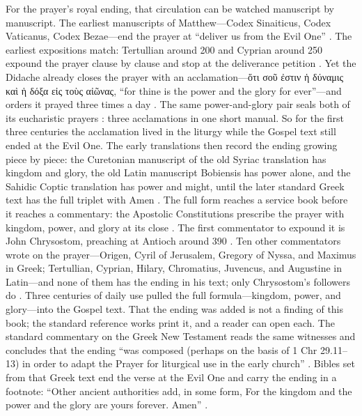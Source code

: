 For the prayer's royal ending, that circulation can be watched manuscript by manuscript.
The earliest manuscripts of Matthew---Codex Sinaiticus, Codex Vaticanus, Codex Bezae---end the prayer at ``deliver us from the Evil One'' \cite[on Matt.~6:13]{westcotthort:appendix}.
The earliest expositions match: Tertullian around 200 and Cyprian around 250 expound the prayer clause by clause and stop at the deliverance petition \cite[2--8]{tertullian:oratione} \cite[9--27]{cyprian:oratione}.
Yet the Didache already closes the prayer with an acclamation---ὅτι σοῦ ἐστιν ἡ δύναμις καὶ ἡ δόξα εἰς τοὺς αἰῶνας, ``for thine is the power and the glory for ever''---and orders it prayed three times a day \cite[8.2--8.3]{didache}.
The same power-and-glory pair seals both of its eucharistic prayers \cite[9.4, 10.5]{didache}: three acclamations in one short manual.
So for the first three centuries the acclamation lived in the liturgy while the Gospel text still ended at the Evil One.
The early translations then record the ending growing piece by piece: the Curetonian manuscript of the old Syriac translation has kingdom and glory, the old Latin manuscript Bobiensis has power alone, and the Sahidic Coptic translation has power and might, until the later standard Greek text has the full triplet with Amen \cite[on Matt.~6:13]{westcotthort:appendix}.
The full form reaches a service book before it reaches a commentary: the Apostolic Constitutions prescribe the prayer with kingdom, power, and glory at its close \cite[on Matt.~6:13]{westcotthort:appendix}.
The first commentator to expound it is John Chrysostom, preaching at Antioch around 390 \cite[Homily 19]{chrysostom:hommatt}.
Ten other commentators wrote on the prayer---Origen, Cyril of Jerusalem, Gregory of Nyssa, and Maximus in Greek; Tertullian, Cyprian, Hilary, Chromatius, Juvencus, and Augustine in Latin---and none of them has the ending in his text; only Chrysostom's followers do \cite[on Matt.~6:13]{westcotthort:appendix}.
Three centuries of daily use pulled the full formula---kingdom, power, and glory---into the Gospel text.
That the ending was added is not a finding of this book; the standard reference works print it, and a reader can open each.
The standard commentary on the Greek New Testament reads the same witnesses and concludes that the ending ``was composed (perhaps on the basis of 1 Chr 29.11--13) in order to adapt the Prayer for liturgical use in the early church'' \cite[on Matt.~6:13]{metzger:textual}.
Bibles set from that Greek text end the verse at the Evil One and carry the ending in a footnote: ``Other ancient authorities add, in some form, For the kingdom and the power and the glory are yours forever. Amen'' \cite[Matt.~6:13, note]{nrsv:ue}.
